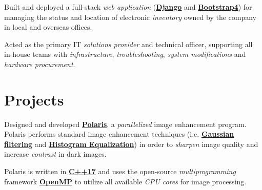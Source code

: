 \documentclass[]{openfont}
\begin{document}
\begin{minipage}[t]{0.65\textwidth}
    \begin{tightemize}
        \item Built and deployed a full-stack \textit{web application} (\href{https://www.djangoproject.com/}{\textbf{Django}} and \href{https://getbootstrap.com/}{\textbf{Bootstrap4}}) for managing the status and location of electronic \textit{inventory} owned by the company in local and overseas offices.
        \item Acted as the primary IT \textit{solutions provider} and technical officer, supporting all in-house teams with \textit{infrastructure}, \textit{troubleshooting}, \textit{system modifications} and \textit{hardware procurement}.
    \end{tightemize}
    \sectionsep


    \section{Projects}
    \begin{tightemize}
        \item Designed and developed \textbf{\href{https://github.com/OwaisK4/Parallel_Image_Enhancement}{Polaris}}, a \textit{parallelized} image enhancement program. Polaris performs standard image enhancement techniques (i.e. \href{https://en.wikipedia.org/wiki/Gaussian_filter}{\textbf{Gaussian filtering}} and \href{https://en.wikipedia.org/wiki/Histogram_equalization}{\textbf{Histogram Equalization}}) in order to \textit{sharpen} image quality and increase \textit{contrast} in dark images.\\

        \item Polaris is written in \textbf{\href{https://en.cppreference.com/w/cpp/17}{C++17}} and uses the open-source \textit{multiprogramming} framework \textbf{\href{https://www.openmp.org/}{OpenMP}} to utilize all available \textit{CPU cores} for image processing. \\
    \end{tightemize}
    \sectionsep


\end{minipage}
\end{document}
